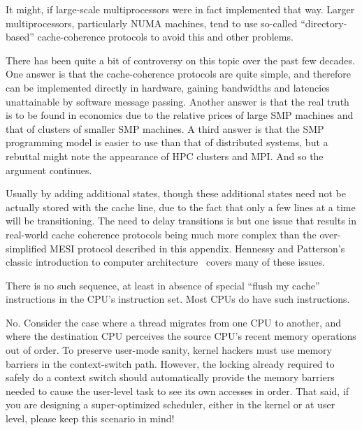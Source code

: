 	It might, if large-scale multiprocessors were in fact implemented
	that way.  Larger multiprocessors, particularly NUMA machines,
	tend to use so-called ``directory-based'' cache-coherence
	protocols to avoid this and other problems.


	There has been quite a bit of controversy on this topic over
	the past few decades.  One answer is that the cache-coherence
	protocols are quite simple, and therefore can be implemented
	directly in hardware, gaining bandwidths and latencies
	unattainable by software message passing.  Another answer is that
	the real truth is to be found in economics due to the relative
	prices of large SMP machines and that of clusters of smaller
	SMP machines.  A third answer is that the SMP programming
	model is easier to use than that of distributed systems, but
	a rebuttal might note the appearance of HPC clusters and MPI.
	And so the argument continues.


	Usually by adding additional states, though these additional
	states need not be actually stored with the cache line, due to
	the fact that only a few lines at a time will be transitioning.
	The need to delay transitions is but one issue that results in
	real-world cache coherence protocols being much more complex than
	the over-simplified MESI protocol described in this appendix.
	Hennessy and Patterson's classic introduction to computer
	architecture~\cite{Hennessy95a} covers many of these issues.


	There is no such sequence, at least in absence of special
	``flush my cache'' instructions in the CPU's instruction set.
	Most CPUs do have such instructions.


	No.  Consider the case where a thread migrates from one CPU to
	another, and where the destination CPU perceives the source
	CPU's recent memory operations out of order.  To preserve
	user-mode sanity, kernel hackers must use memory barriers in
	the context-switch path.  However, the locking already required
	to safely do a context switch should automatically provide
	the memory barriers needed to cause the user-level task to see
	its own accesses in order.  That said, if you are designing a
	super-optimized scheduler, either in the kernel or at user level,
	please keep this scenario in mind!

